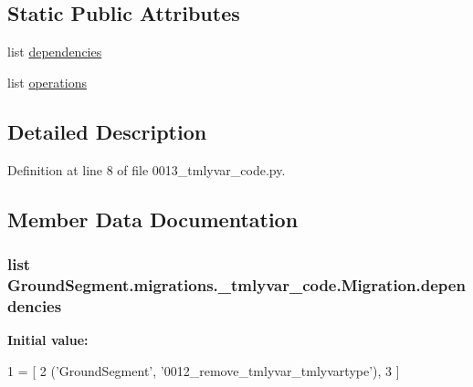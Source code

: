 \subsection*{Static Public Attributes}
\begin{DoxyCompactItemize}
\item 
list \hyperlink{class_ground_segment_1_1migrations_1_10013__tmlyvar__code_1_1_migration_a984308ea0119fc23ca86b38925491b14}{dependencies}
\item 
list \hyperlink{class_ground_segment_1_1migrations_1_10013__tmlyvar__code_1_1_migration_a05a093418351362cd5907ac2a99d6292}{operations}
\end{DoxyCompactItemize}


\subsection{Detailed Description}


Definition at line 8 of file 0013\+\_\+tmlyvar\+\_\+code.\+py.



\subsection{Member Data Documentation}
\hypertarget{class_ground_segment_1_1migrations_1_10013__tmlyvar__code_1_1_migration_a984308ea0119fc23ca86b38925491b14}{}
\subsubsection[{dependencies}]{\setlength{\rightskip}{0pt plus 5cm}list Ground\+Segment.\+migrations.\+\_\+tmlyvar\+\_\+code.\+Migration.\+dependencies\hspace{0.3cm}{\ttfamily [static]}}\label{class_ground_segment_1_1migrations_1_10013__tmlyvar__code_1_1_migration_a984308ea0119fc23ca86b38925491b14}
{\bfseries Initial value\+:}
\begin{DoxyCode}
1 = [
2         (\textcolor{stringliteral}{'GroundSegment'}, \textcolor{stringliteral}{'0012\_remove\_tmlyvar\_tmlyvartype'}),
3     ]
\end{DoxyCode}


